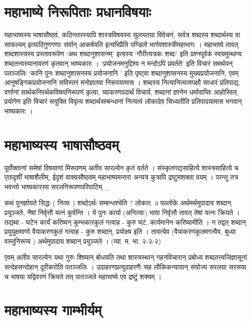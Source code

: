 \section*{महाभाष्ये निरूपिताः प्रधानविषयाः}

महाभाष्यस्य भाषासौष्ठवं, कठिनतरस्यापि शास्त्रविषयस्य सुलभतया विवेचनं, सर्वत्र शब्दस्य शब्दार्थस्य वा साफल्यम् इत्यादिगुणगणाः सर्वान् आकर्षयति इत्यभिप्रैति पण्डितो भार्गवशास्त्रीमहाभागः । महाभाष्ये तावत् शब्दशास्त्रस्य प्रस्तावरूपेण ‘अथ शब्दानुशासनम्’ इत्यस्य ‘गौरीत्यत्रकः शब्दः’ इति प्रश्नपूर्वकं स्वयमुत्थाप्य शब्दतत्त्वस्यानावरणं कृतवान् भाष्यकारः । ‘प्रयोजनमनुद्दिश्य न मन्दोऽपि प्रवर्तते’ इति विचारं समर्थयन् पतञ्जलिः ‘कानि पुनः शब्दानुशासनस्य प्रयोजनानि ’ इति पृष्ट्वा शब्दानुशासनस्य मुख्यप्रयोजनानि, एवम् आनुषङ्गिकप्रयोजनानि सविस्तरं मनोज्ञतया निरूपयामास । शब्दस्य नित्यानित्यत्वपक्षौ साधारं प्रतिपाद्य, वर्णानां सार्थकनिरर्थकविषयनिरूपणं कृत्वा, व्याकरणपदार्थं विचार्य, शब्दानां ज्ञानेन धर्मावाप्तिः आहोस्वित् प्रयोगेण इति विचारं सयुक्ति विवृत्य शब्दार्थसम्बन्धानां नित्यत्वं लोकादेव सिध्यतीति प्रतिपादयामास भगवान् भाष्यकारः ।

\section*{महाभाष्यस्य भाषासौष्ठवम्}

पूर्वोक्तानां समेषां विषयाणां मिरूपणम् अतीव सारल्येन कृतं वर्तते । संस्कृतगद्यसाहित्ये शास्त्रसाहित्ये च एतादृशीं भाषाशैलीम्, ईदृशं वाक्यसौष्ठवम् महाभाष्यमन्तरा अन्यत्र कुत्रापि द्रष्टुमशक्ता वयम् । परन्तु तत्र भवन्तो भाष्यकारस्य सरलनिरूपणपरिपाटिम् _

कथं पुनर्ज्ञायते सिद्धः ( नित्यः ) शब्दोऽर्थः सम्बन्धश्चेति ? लोकतः ॥ यल्लोके अर्थमर्थमुपादाय शब्दान् प्रयुञ्जते, नैषां निर्वृत्तौ यत्नं कुर्वन्ति । ये पुनः कार्या (अनित्याः) भावा निर्वृत्तौ तावत् तेषां यत्नः क्रियते । तद्यथा - घटेन कार्यं करिष्यन् कुम्भकारकुलं गत्वाह - कुरु घटं, कार्यमानेन करिष्यामीति । न तद्वत् शब्दान् प्रयुयुक्षमाणो वैयाकरणकुलं गत्वाह - कुरु शब्दान्, प्रयोक्ष्य इति । तावत्येव (वैयाकरणकुलमगत्वैव, बुध्या वस्तुनिरूप्य ) अर्थमुपादाय शब्दान् प्रयुञ्जते । (व्या. म. भा. २-२-२)

एवम् अतीव सारल्येन यथा गुरुः शिष्यान् बोधयति तथा शास्त्रस्थान् गहनविचारान् प्रबोध्य शब्दतत्त्वजिज्ञासूनां सन्देहसन्दोहान् दूरीकरोति पतञ्जलिः । उदाहरणप्रत्युदाहरणैः सह लौकिकन्यायान् संयोज्य सरलया सरसया च भाषया यद्विवरणं क्रियते तत् पातञ्जले महाभाष्ये एव द्रष्टुं शक्यम् ।

\section*{महाभाष्यस्य गाम्भीर्यम्}

